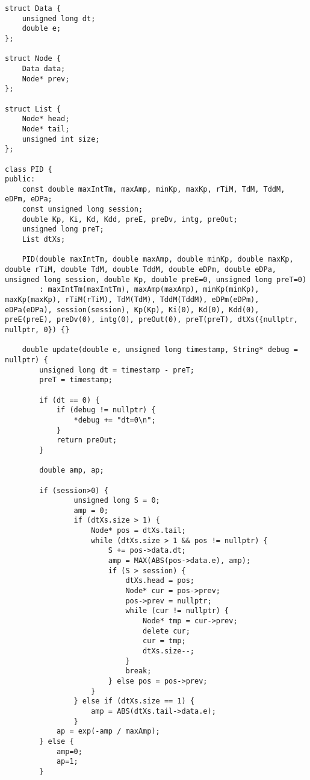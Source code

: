 \documentclass[a4paper,12pt]{report}
\begin{document}
\begin{lstlising}[language=C++]
\begin{lstlisting}
struct Data {
    unsigned long dt;
    double e;
};

struct Node {
    Data data;
    Node* prev;
};

struct List {
    Node* head;
    Node* tail;
    unsigned int size;
};

class PID {
public:
    const double maxIntTm, maxAmp, minKp, maxKp, rTiM, TdM, TddM, eDPm, eDPa;
    const unsigned long session;
    double Kp, Ki, Kd, Kdd, preE, preDv, intg, preOut;
    unsigned long preT;
    List dtXs;

    PID(double maxIntTm, double maxAmp, double minKp, double maxKp, double rTiM, double TdM, double TddM, double eDPm, double eDPa, unsigned long session, double Kp, double preE=0, unsigned long preT=0)
        : maxIntTm(maxIntTm), maxAmp(maxAmp), minKp(minKp), maxKp(maxKp), rTiM(rTiM), TdM(TdM), TddM(TddM), eDPm(eDPm), eDPa(eDPa), session(session), Kp(Kp), Ki(0), Kd(0), Kdd(0), preE(preE), preDv(0), intg(0), preOut(0), preT(preT), dtXs({nullptr, nullptr, 0}) {}

    double update(double e, unsigned long timestamp, String* debug = nullptr) {
        unsigned long dt = timestamp - preT;
        preT = timestamp;

        if (dt == 0) {
            if (debug != nullptr) {
                *debug += "dt=0\n";
            }
            return preOut;
        }

        double amp, ap;

        if (session>0) {
                unsigned long S = 0;
                amp = 0;
                if (dtXs.size > 1) {
                    Node* pos = dtXs.tail;
                    while (dtXs.size > 1 && pos != nullptr) {
                        S += pos->data.dt;
                        amp = MAX(ABS(pos->data.e), amp);
                        if (S > session) {
                            dtXs.head = pos;
                            Node* cur = pos->prev;
                            pos->prev = nullptr;
                            while (cur != nullptr) {
                                Node* tmp = cur->prev;
                                delete cur;
                                cur = tmp;
                                dtXs.size--;
                            }
                            break;
                        } else pos = pos->prev;
                    }
                } else if (dtXs.size == 1) {
                    amp = ABS(dtXs.tail->data.e);
                }        
            ap = exp(-amp / maxAmp);
        } else {
            amp=0;
            ap=1;
        }


\end{lstlisting}
\end{lstlising}
\end{document}
